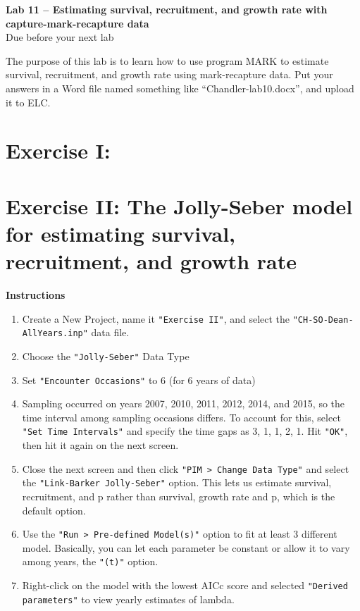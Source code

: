 \documentclass[12pt]{article}
\begin{document}
{
  \Large
  \centering
  {\bf Lab 11 -- Estimating survival, recruitment, and growth rate
    with capture-mark-recapture data} \\
  Due before your next lab \par
}

\vspace{10pt}


The purpose of this lab is to learn how to use program MARK to
estimate survival, recruitment, and growth rate using mark-recapture
data. Put your answers in a Word file named something like
``Chandler-lab10.docx'', and upload it to ELC.





\section*{\large Exercise I: }


\clearpage

\section*{\large  Exercise II: The Jolly-Seber model for estimating
  survival, recruitment, and growth rate}

{\bf Instructions}

\begin{enumerate}
  \item Create a New Project, name it \verb+"Exercise II"+, and select
    the \verb+"CH-SO-Dean-AllYears.inp"+ data file.
  \item Choose the \verb+"Jolly-Seber"+ Data Type
  \item Set \verb+"Encounter Occasions"+ to 6 (for 6 years of data)
  \item Sampling occurred on years 2007, 2010, 2011, 2012, 2014, and
    2015, so the time interval among sampling occasions differs. To
    account for this, select \verb+"Set Time Intervals"+ and specify the
    time gaps as 3, 1, 1, 2, 1. Hit \verb+"OK"+, then hit it again on
    the next screen.
  \item Close the next screen and then click
    \verb+"PIM > Change Data Type"+ and select the
    \verb+"Link-Barker Jolly-Seber"+ option. This lets us estimate
    survival, recruitment, and p rather than survival, growth rate and
    p, which is the default option.
  \item Use the \verb+"Run > Pre-defined Model(s)"+ option to fit at
    least 3 different model. Basically, you can let each parameter be
    constant or allow it to vary among years, the \verb+"(t)"+ option.
  \item Right-click on the model with the lowest AICc
  score and selected \verb+"Derived parameters"+ to view yearly
  estimates of lambda.
\end{enumerate}
\end{document}
